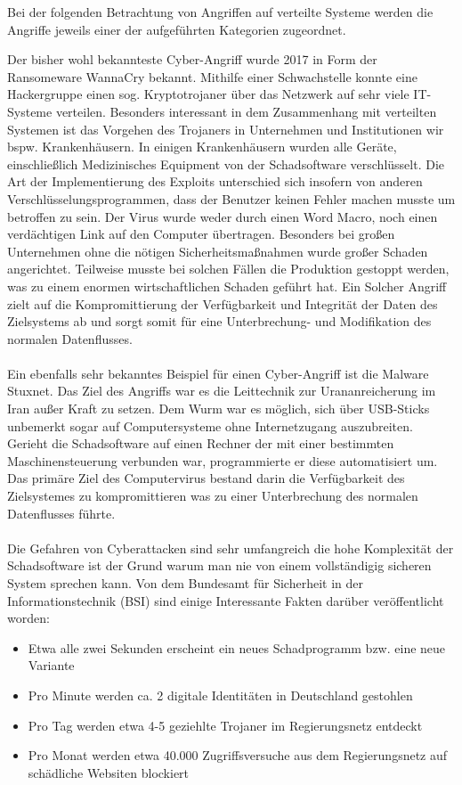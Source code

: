 \documentclass[utf8,biblatex]{lni}
\begin{document}
Bei der folgenden Betrachtung von Angriffen auf verteilte Systeme werden die Angriffe jeweils einer 
der aufgeführten Kategorien zugeordnet. 

Der bisher wohl bekannteste Cyber-Angriff wurde 2017 in Form der Ransomeware \glqq WannaCry \grqq{} bekannt.
Mithilfe einer Schwachstelle konnte eine Hackergruppe einen sog. Kryptotrojaner über das Netzwerk
auf sehr viele IT-Systeme verteilen. Besonders interessant in dem Zusammenhang mit verteilten Systemen ist 
das Vorgehen des Trojaners in Unternehmen und Institutionen wir bspw. Krankenhäusern. 
In einigen Krankenhäusern wurden alle Geräte, einschließlich Medizinisches Equipment von 
der Schadsoftware verschlüsselt. 
Die Art der Implementierung des Exploits unterschied sich insofern von anderen Verschlüsselungsprogrammen, 
dass der Benutzer keinen Fehler machen musste um betroffen zu sein. 
Der Virus wurde weder durch einen Word Macro, noch einen verdächtigen Link auf den Computer übertragen. 
Besonders bei großen Unternehmen ohne die nötigen Sicherheitsmaßnahmen wurde großer Schaden angerichtet. 
Teilweise musste bei solchen Fällen die Produktion gestoppt werden, was zu einem enormen wirtschaftlichen 
Schaden geführt hat. 
Ein Solcher Angriff zielt auf die Kompromittierung der Verfügbarkeit und Integrität der Daten des 
Zielsystems ab und sorgt somit für eine Unterbrechung- und Modifikation des normalen Datenflusses. 
\\\\
Ein ebenfalls sehr bekanntes Beispiel für einen Cyber-Angriff ist die Malware \glqq Stuxnet. \grqq{}
Das Ziel des Angriffs war es die Leittechnik zur Urananreicherung im Iran außer Kraft zu setzen. 
Dem Wurm war es möglich, sich über USB-Sticks unbemerkt sogar auf Computersysteme ohne Internetzugang 
auszubreiten. Gerieht die Schadsoftware auf einen Rechner der mit einer bestimmten Maschinensteuerung 
verbunden war, programmierte er diese automatisiert um. Das primäre Ziel des Computervirus bestand darin 
die Verfügbarkeit des Zielsystemes zu kompromittieren was zu einer Unterbrechung des normalen Datenflusses führte. 
\\\\
Die Gefahren von Cyberattacken sind sehr umfangreich die hohe Komplexität der Schadsoftware ist der 
Grund warum man nie von einem vollständigig sicheren System sprechen kann. 
Von dem Bundesamt für Sicherheit in der Informationstechnik (BSI) sind einige Interessante Fakten darüber veröffentlicht worden: 
\begin{itemize}
    \item Etwa alle zwei Sekunden erscheint ein neues Schadprogramm bzw. eine neue Variante
    \item Pro Minute werden ca. 2 digitale Identitäten in Deutschland gestohlen
    \item Pro Tag werden etwa 4-5 geziehlte Trojaner im Regierungsnetz entdeckt
    \item Pro Monat werden etwa 40.000 Zugriffsversuche aus dem Regierungsnetz auf schädliche Websiten blockiert
\end{itemize}
\end{document}
